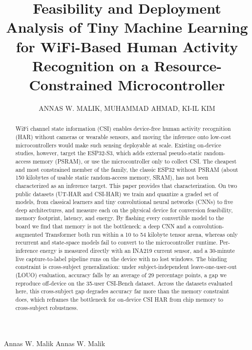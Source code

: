 \documentclass{ieeeaccess}
\begin{document}

\title{Feasibility and Deployment Analysis of Tiny Machine Learning for WiFi-Based Human Activity Recognition on a Resource-Constrained Microcontroller}
\author{
\uppercase{Annas W. Malik},
\uppercase{Muhammad Ahmad},
\uppercase{Ki-Il Kim}
}

\address{
Faculty of Information Technology \& Computer Science, University of Central Punjab, Lahore, 54000, Pakistan.\\
Department of Computer Science and Engineering, Chungnam National University, Daejeon, 34134, Korea.
}


\markboth
{Annas W. Malik \headeretal}
{Annas W. Malik \headeretal}



\begin{abstract}
WiFi channel state information (CSI) enables device-free human activity recognition (HAR) without cameras or wearable sensors, and moving the inference onto low-cost microcontrollers would make such sensing deployable at scale. Existing on-device studies, however, target the ESP32-S3, which adds external pseudo-static random-access memory (PSRAM), or use the microcontroller only to collect CSI. The cheapest and most constrained member of the family, the classic ESP32 without PSRAM (about 150 kilobytes of usable static random-access memory, SRAM), has not been characterized as an inference target. This paper provides that characterization. On two public datasets (UT-HAR and CSI-HAR) we train and quantize a graded set of models, from classical learners and tiny convolutional neural networks (CNNs) to five deep architectures, and measure each on the physical device for conversion feasibility, memory footprint, latency, and energy. By flashing every convertible model to the board we find that memory is not the bottleneck: a deep CNN and a convolution-augmented Transformer both run within a 10 to 54 kilobyte tensor arena, whereas only recurrent and state-space models fail to convert to the microcontroller runtime. Per-inference energy is measured directly with an INA219 current sensor, and a 30-minute live capture-to-label pipeline runs on the device with no lost windows. The binding constraint is cross-subject generalization: under subject-independent leave-one-user-out (LOUO) evaluation, accuracy falls by an average of 29 percentage points, a gap we reproduce off-device on the 35-user CSI-Bench dataset. Across the datasets evaluated here, this cross-subject gap degrades accuracy far more than the memory constraint does, which reframes the bottleneck for on-device CSI HAR from chip memory to cross-subject robustness.
\end{abstract}
\end{document}
